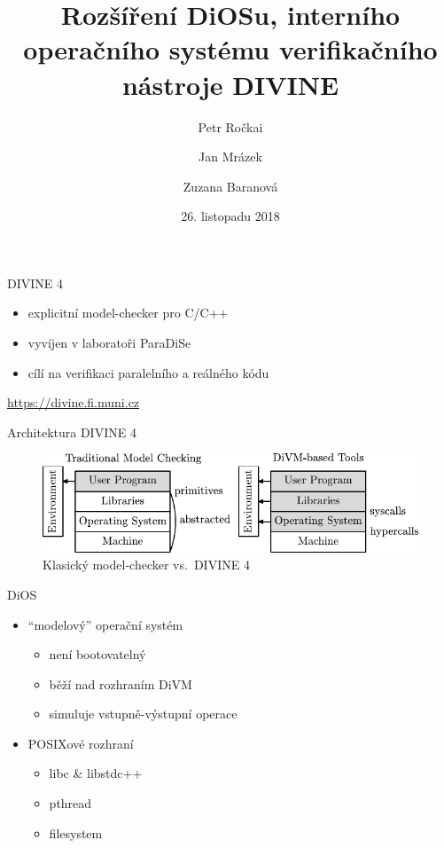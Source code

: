 \documentclass[large,ignorenonframetext,aspectratio=169,]{paradise-slide}
\title[DiOS]{Rozšíření DiOSu, interního operačního systému verifikačního nástroje
DIVINE}
\author{Petr Ročkai \and Jan Mrázek \and Zuzana Baranová}
\date{26. listopadu 2018}
\providecommand{\tightlist}{%
  \setlength{\itemsep}{0pt}\setlength{\parskip}{0pt}}
\begin{document}
\frame[plain]{\titlepage}

\begin{frame}{DIVINE 4}
\protect\hypertarget{divine-4}{}

\begin{itemize}
\tightlist
\item
  explicitní model-checker pro C/C++
\item
  vyvíjen v laboratoři ParaDiSe
\item
  cílí na verifikaci paralelního a reálného kódu
\end{itemize}

\centering
\bigskip

\url{https://divine.fi.muni.cz}

\end{frame}

\begin{frame}{Architektura DIVINE 4}
\protect\hypertarget{architektura-divine-4}{}

\begin{figure}
\centering
\includegraphics{divine_arch.pdf}
\caption{Klasický model-checker vs.~DIVINE 4}
\end{figure}

\end{frame}

\begin{frame}{DiOS}
\protect\hypertarget{dios}{}

\begin{itemize}
\tightlist
\item
  ``modelový'' operační systém

  \begin{itemize}
  \tightlist
  \item
    není bootovatelný
  \item
    běží nad rozhraním DiVM
  \item
    simuluje vstupně-výstupní operace
  \end{itemize}
\item
  POSIXové rozhraní

  \begin{itemize}
  \tightlist
  \item
    libc \& libstdc++
  \item
    pthread
  \item
    filesystem
  \end{itemize}
\end{itemize}

\end{frame}
\end{document}
